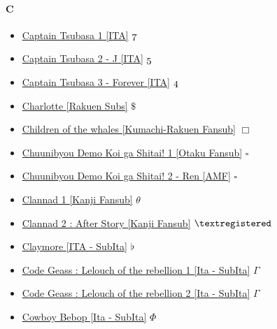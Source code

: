 		\paragraph{C} \hypertarget{SC}{}
			\begin{itemize}
				
				\item \href{https://mega.nz/#F!mHBy1AxA!BHQw-rhRpDYo-vJs-RS-bg} {Captain Tsubasa 1  [ITA]}  $\oldstylenums{7}$ \\
				\item \href{https://mega.nz/#F!6rAgwYSY!XoYgDPKn7iFFhEFrZ5MXMA} {Captain Tsubasa 2 - J [ITA]}  $\oldstylenums{5}$ \\
				\item \href{https://mega.nz/#F!2DIyFZQR!k_xrkOJEjUUEOGxAqm7oqA} {Captain Tsubasa 3 - Forever [ITA]}  $\oldstylenums{4}$ \\
				\item \href{https://mega.nz/#F!yKpwFKTQ!kKDqlAclZsroprSiS_zfAA} {Charlotte [Rakuen Subs]}  $\$$ \\
				\item \href{https://mega.nz/#F!AvJRGJLa!iLit1qdpxA-NDIowdVjFcg} {Children of the whales [Kumachi-Rakuen Fansub]}  $\Box$ \\
				\item \href{https://mega.nz/#F!v9E0Va4C!r6p9Qp0GsdiiCapEvU8mZQ} {Chuunibyou Demo Koi ga Shitai! 1 [Otaku Fansub]}  $\square$ \\
				\item \href{https://mega.nz/#F!GlsW1ZAR!NJ0tuM8gFWZwwsvPvadj5w} {Chuunibyou Demo Koi ga Shitai! 2 - Ren [AMF]}  $\square$ \\
				\item \href{https://mega.nz/#F!xsl1FArL!UJWiyeSwpYSarhB4sLRmhQ} {Clannad 1 [Kanji Fansub]}  $\theta$ \\ 
				\item \href{https://mega.nz/#F!H6RyDaSR!-4WJwuTyYKmEu5d3puzDPg} {Clannad 2 : After Story [Kanji Fansub]}  $\textregistered$ \\
				\item \href{https://mega.nz/#F!EjQyGQBL!uZxAzraFZ6yFtn2fsGOsIw} {Claymore [ITA - SubIta]}  $\flat$ \\
				\item \href{https://mega.nz/#F!g18XjJSB!Coc1umv258yaTQrCYccr_A} {Code Geass : Lelouch of the rebellion 1 [Ita - SubIta]}  $\Gamma$ \\
				\item \href{https://mega.nz/#F!RpkGnQbD!gYc_dwav1if4Nx2soKfSIw} {Code Geass : Lelouch of the rebellion 2 [Ita - SubIta]}  $\Gamma$ \\
				\item \href{https://mega.nz/#F!hDh1VYQR!3sf_tIHGgC2oLeK9rrKftw} {Cowboy Bebop [Ita - SubIta]}  $\Phi$ \\
			
			\end{itemize}	
		
